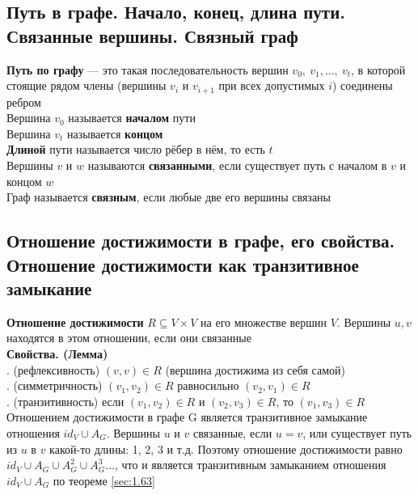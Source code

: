 \documentclass[a4paper]{article}
\begin{document}
\subsection{Путь в графе. Начало, конец, длина пути. Связанные вершины. Связный граф}
\textbf{Путь по графу} — это такая последовательность вершин $v_0,\ v_1,\ldots,\ v_t$, в которой стоящие рядом члены (вершины $v_i$ и $v_{i+1}$ при всех допустимых $i$) соединены ребром\\[2mm]
\indent Вершина $v_0$ называется \textbf{началом} пути\\[2mm]
\indent Вершина $v_t$ называется \textbf{концом}\\[2mm]
\indent \textbf{Длиной} пути называется число рёбер в нём, то есть $t$\\[2mm]
\indent Вершины $v$ и $w$ называются \textbf{связанными}, если существует путь с началом в $v$ и концом $w$\\[2mm]
\indent Граф называется \textbf{связным}, если любые две его вершины связаны
\subsection{Отношение достижимости в графе, его свойства. Отношение достижимости как транзитивное замыкание}
\textbf{Отношение достижимости} $R\subseteq V\times V$ на его множестве вершин $V$. Вершины $u, v$ находятся в этом отношении, если они связанные\\[2mm]
\label{sec:1.67}\textbf{Свойства. (Лемма)}\\[2mm]
. (рефлексивность) $(v, v) \in R$ (вершина достижима из себя самой)\\[2mm]
. (симметричность) $(v_1, v_2) \in R$ равносильно $(v_2, v_1) \in R$\\[2mm]
. (транзитивность) если $(v_1, v_2) \in R$ и $(v_2, v_3)\in R$, то $(v_1, v_3) \in R$\\[2mm]
\indent Отношением достижимости в графе G является транзитивное замыкание отношения $id_V \cup A_G$. Вершины $u$ и $v$ связанные, если $u=v$, или существует путь из $u$ в $v$ какой-то длины: 1, 2, 3 и т.д. Поэтому отношение достижимости равно $id_V \cup A_G\cup A^2_G\cup A^3_G\ldots$, что и является транзитивным замыканием отношения $id_V \cup A_G$ по теореме \ref{sec:1.63}
\end{document}
